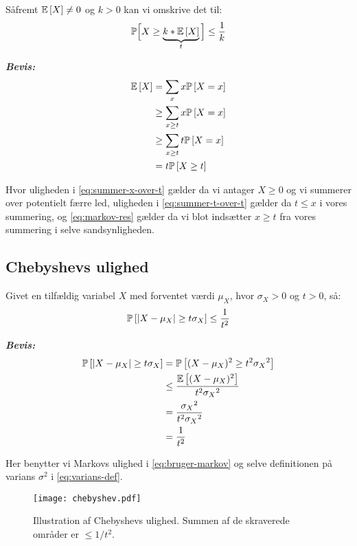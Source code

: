 Såfremt $\E{X} \neq 0$ og $k > 0$ kan vi omskrive det til:
$$
\mathbb{P} \Big[X \geq \underbrace{k * \E{X}}_{t} \Big] \leq \frac{1}{k}
$$

\textit{\textbf{Bevis:}}
\begin{align}
  \E{X}
  &= \sum_x x \P{X = x} \nonumber \\
  &\geq \sum_{x \geq t} x \P{X = x} \label{eq:summer-x-over-t} \\
  &\geq \sum_{x \geq t} t \P{X = x} \label{eq:summer-t-over-t} \\
  &= t \P{X \geq t} \label{eq:markov-res}
\end{align}

Hvor uligheden i \cref{eq:summer-x-over-t} gælder da vi antager $X \geq 0$ og vi summerer over potentielt færre led, uligheden i \cref{eq:summer-t-over-t} gælder da $t \leq x$ i vores summering, og \cref{eq:markov-res} gælder da vi blot indsætter $x \geq t$ fra vores summering i selve sandsynligheden.

\subsection{Chebyshevs ulighed}
Givet en tilfældig variabel $X$ med forventet værdi $\mu_X$, hvor $\sigma_X > 0$ og $t > 0$, så:
\begin{align}
  \P{|X - \mu_X| \geq t \sigma_X} \leq \frac{1}{t^2} \label{eq:chebyshev}
\end{align}

\textit{\textbf{Bevis:}}
\begin{align}
  \P{|X - \mu_X| \geq t \sigma_X}
  &= \P{(X - \mu_X)^2 \geq t^2 {\sigma_X}^2} \nonumber \\
  &\leq \frac{\E{(X - \mu_X)^2}}{t^2 {\sigma_X}^2} \label{eq:bruger-markov} \\
  &= \frac{{\sigma_X}^2}{t^2 {\sigma_X}^2} \label{eq:varians-def} \\
  &= \frac{1}{t^2} \nonumber
\end{align}

Her benytter vi Markovs ulighed i \cref{eq:bruger-markov} og selve definitionen på varians $\sigma^2$ i \cref{eq:varians-def}.

\begin{figure}[H]
  \begin{center}
  \texttt{[image: chebyshev.pdf]}
  \end{center}
  \caption{Illustration af Chebyshevs ulighed. Summen af de skraverede områder er $\leq 1/t^2$.}
  \label{fig:chebyshev}
\end{figure}





